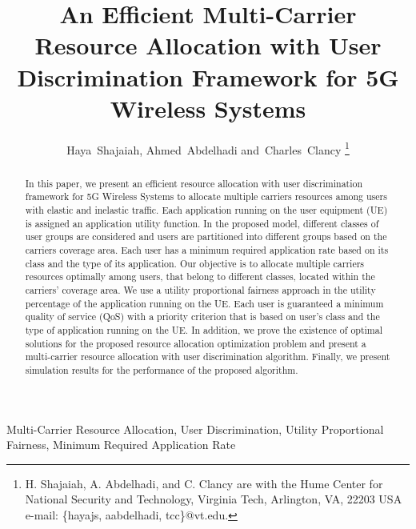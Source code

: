 \documentclass[journal]{IEEEtran} 				\IEEEoverridecommandlockouts 						\usepackage{amsmath,amssymb}
\begin{document}
\title{An Efficient Multi-Carrier Resource Allocation with User Discrimination Framework for 5G Wireless Systems}
\author{Haya~Shajaiah,
        Ahmed~Abdelhadi
        and~Charles~Clancy
\thanks{H. Shajaiah, A. Abdelhadi, and C. Clancy are with the Hume Center for National Security and Technology, Virginia Tech, Arlington,
VA, 22203 USA e-mail: \{hayajs, aabdelhadi, tcc\}@vt.edu.}
}
\maketitle
\begin{abstract}
In this paper, we present an efficient resource allocation with user discrimination framework for 5G Wireless Systems to allocate multiple carriers resources among users with elastic and inelastic traffic. Each application running on the user equipment (UE) is assigned an application utility function. In the proposed model, different classes of user groups are considered and users are partitioned into different groups based on the carriers coverage area. Each user has a minimum required application rate based on its class and the type of its application. Our objective is to allocate multiple carriers resources optimally among users, that belong to different classes, located within the carriers' coverage area. We use a utility proportional fairness approach in the utility percentage of the application running on the UE. Each user is guaranteed a minimum quality of service (QoS) with a priority criterion that is based on user's class and the type of application running on the UE. In addition, we prove the existence of optimal solutions for the proposed resource allocation optimization problem and present a multi-carrier resource allocation with user discrimination algorithm. Finally, we present simulation results for the performance of the proposed algorithm.
\end{abstract}

\begin{IEEEkeywords}
Multi-Carrier Resource Allocation, User Discrimination, Utility Proportional Fairness, Minimum Required Application Rate
\end{IEEEkeywords}

\providelength{\AxesLineWidth}       \setlength{\AxesLineWidth}{0.5pt}\providelength{\plotwidth}           \setlength{\plotwidth}{8cm}\providelength{\LineWidth}           \setlength{\LineWidth}{0.7pt}\providelength{\MarkerSize}          \setlength{\MarkerSize}{3pt}
\end{document}
